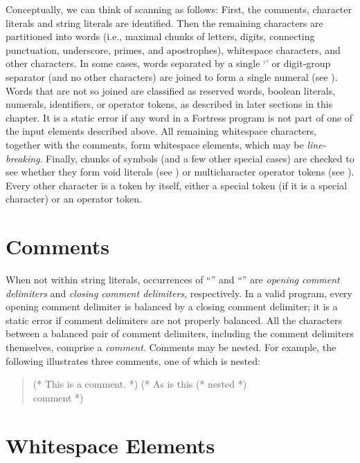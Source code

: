 Conceptually,
we can think of scanning as follows:
First, the comments,
character literals and string literals
are identified.
Then the remaining characters are partitioned into
words
(i.e., maximal chunks of
letters, digits, connecting punctuation,
underscore, primes, and apostrophes),
whitespace characters,
and other characters.
In some cases,
words separated by a single `'
or digit-group separator (and no other characters)
are joined to form a single numeral
(see ).
Words that are not so joined
are classified as reserved words,
boolean literals, numerals, identifiers, or operator tokens,
as described in later sections in this chapter.
It is a static error
if any word in a Fortress program
is not part of one of the input elements described above.
All remaining whitespace characters,
together with the comments,
form whitespace elements,
which may be \emph{line-breaking}.
Finally,
chunks of symbols
(and a few other special cases)
are checked to see whether they form
void literals (see )
or multicharacter operator tokens
(see ).
Every other character is a token by itself,
either a special token
(if it is a special character)
or an operator token.


\section{Comments}

When not within string literals,
occurrences of ``\EXP{(*}'' and ``\EXP{*)}''
are \emph{opening comment delimiters}
and \emph{closing comment delimiters}, respectively.
In a valid program,
every opening comment delimiter
is balanced by a closing comment delimiter;
it is a static error if comment delimiters are not properly balanced.
All the characters between a balanced pair of comment delimiters,
including the comment delimiters themselves,
comprise a \emph{comment}.
Comments may be nested.
For example, the following illustrates three comments,
one of which is nested:
\begin{quote}
(* This is a comment. *)  (* As is this (* nested *) \\ comment *)
\end{quote}


\section{Whitespace Elements}

